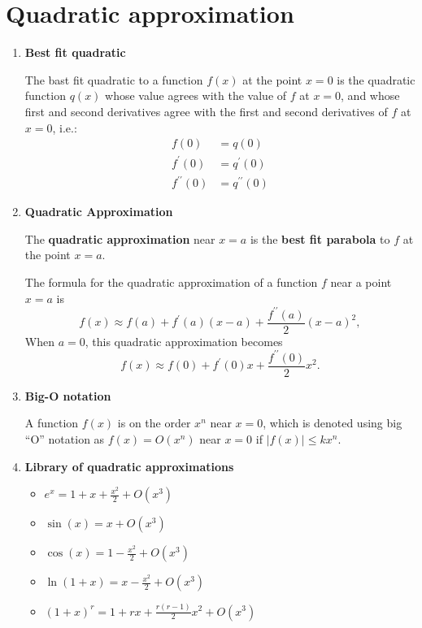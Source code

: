 \section{Quadratic approximation}
\begin{enumerate}
    \item \textbf{Best fit quadratic}

        The bast fit quadratic to a function $f(x)$ at the point $x=0$ is the quadratic function $q(x)$ whose value agrees with the value of $f$ at $x=0$, and whose first and second derivatives agree with the first and second derivatives of $f$ at $x=0$, i.e.:
        \begin{align*}
            f(0) & =q(0) \\
            f^\prime(0) & =q^\prime (0) \\
            f^{\prime\prime}(0) & =q^{\prime\prime}(0)
        \end{align*}
    \item \textbf{Quadratic Approximation}

        The \textbf{quadratic approximation} near $x=a$ is the \textbf{best fit parabola} to $f$ at the point $x=a$.

        The formula for the quadratic approximation of a function $f$ near a point $x=a$ is 
        $$
        f(x)\approx f(a)+f^\prime(a)(x-a)+\frac{f^{\prime\prime}(a)}{2}(x-a)^2,
        $$
        When $a=0$, this quadratic approximation becomes
        $$
        f(x)\approx f(0)+f^\prime (0)x+\frac{f^{\prime\prime}(0)}{2}x^2.
        $$
    \item \textbf{Big-O notation}

        A function $f(x)$ is on the order $x^n$ near $x=0$, which is denoted using big ``O'' notation as $f(x)=O(x^n)$ near $x=0$ if $|f(x)|\leq kx^n$.
    \item \textbf{Library of quadratic approximations}
        \begin{itemize}
            \item $e^x=1+x+\frac{x^2}{2}+O(x^3)$
            \item $\sin(x)=x+O(x^3)$
            \item $\cos(x)=1-\frac{x^2}{2}+O(x^3)$
            \item $\ln(1+x)=x-\frac{x^2}{2}+O(x^3)$
            \item $(1+x)^r=1+rx+\frac{r(r-1)}{2}x^2+O(x^3)$
        \end{itemize}
\end{enumerate}

